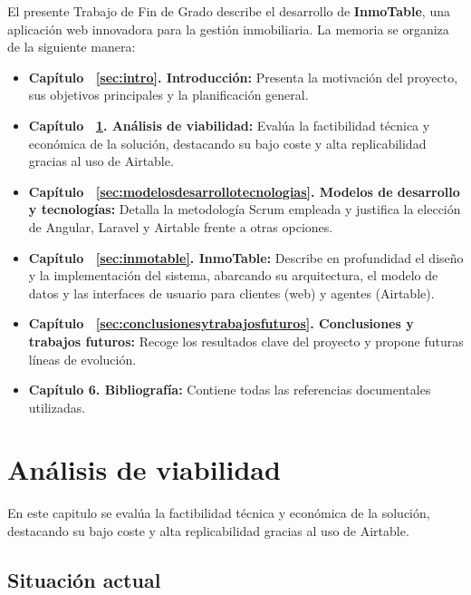 El presente Trabajo de Fin de Grado describe el desarrollo de \textbf{InmoTable}, una aplicación web innovadora para la gestión inmobiliaria. La memoria se organiza de la siguiente manera:

\begin{itemize}
    \item \textbf{Capítulo ~\ref{sec:intro}. Introducción:} Presenta la motivación del proyecto, sus objetivos principales y la planificación general.

    \item \textbf{Capítulo ~\ref{sec:analisisviabilidad}. Análisis de viabilidad:} Evalúa la factibilidad técnica y económica de la solución, destacando su bajo coste y alta replicabilidad gracias al uso de Airtable.

    \item \textbf{Capítulo ~\ref{sec:modelosdesarrollotecnologias}. Modelos de desarrollo y tecnologías:} Detalla la metodología Scrum empleada y justifica la elección de Angular, Laravel y Airtable frente a otras opciones.

    \item \textbf{Capítulo ~\ref{sec:inmotable}. InmoTable:} Describe en profundidad el diseño y la implementación del sistema, abarcando su arquitectura, el modelo de datos y las interfaces de usuario para clientes (web) y agentes (Airtable).

    \item \textbf{Capítulo ~\ref{sec:conclusionesytrabajosfuturos}. Conclusiones y trabajos futuros:} Recoge los resultados clave del proyecto y propone futuras líneas de evolución.

    \item \textbf{Capítulo 6. Bibliografía:} Contiene todas las referencias documentales utilizadas.
\end{itemize}


\chapter{Análisis de viabilidad} 
\label{sec:analisisviabilidad}


En este capitulo se evalúa la factibilidad técnica y económica de la solución, destacando su bajo coste y alta replicabilidad gracias al uso de Airtable.


\section{Situación actual}


